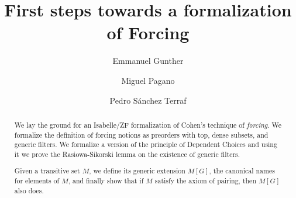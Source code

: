 \documentclass{article}
\begin{document}
\title{First steps towards a formalization of Forcing}
\author{Emmanuel Gunther
  \and 
  Miguel Pagano
  \and 
  Pedro S\'anchez Terraf}
\maketitle

\begin{abstract} 
  We lay the ground for an Isabelle/ZF formalization of Cohen's technique of
  \emph{forcing}. We formalize the definition of forcing notions as
  preorders with top, dense subsets, and generic filters. We formalize
  a version of the principle of Dependent Choices and using it
  we prove the Rasiowa-Sikorski lemma on the existence of generic filters.
  
  Given a transitive set $M$, we define its generic extension $M[G]$,
  the canonical names for elements of $M$, and finally show that if $M$
  satisfy the axiom of pairing, then $M[G]$ also does.
\end{abstract}






















\end{document}
